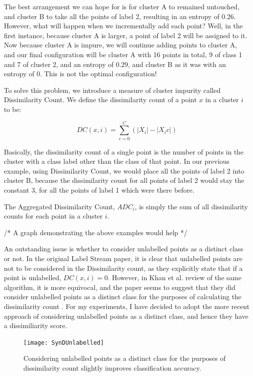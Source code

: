 \documentclass[12pt,a4paper,oneside]{report}
\begin{document}
The best arrangement we can hope for is for cluster A to remained untouched, and cluster B to take all the points of label 2, resulting in an entropy of 0.26. However, what will happen when we incrementally add each point? Well, in the first instance, because cluster A is larger, a point of label 2 will be assigned to it. Now because cluster A is impure, we will continue adding points to cluster A, and our final configuration will be cluster A with 16 points in total, 9 of class 1 and  7 of cluster 2, and an entropy of 0.29, and cluster B as it was with an entropy of 0. This is not the optimal configuration!

To solve this problem, we introduce a measure of cluster impurity called Dissimilarity Count. We define the dissimilarity count of a point \(x\) in a cluster \(i\) to be:

\[DC(x,i) = \sum_{c=0}^C(|X_i| - |X_ic|)\] 

Basically, the dissimilarity count of a single point is the number of points in the cluster with a class label other than the class of that point. In our previous example, using Dissimilarity Count, we would place all the points of label 2 into cluster B, because the dissimilarity count for all points of label 2 would stay the constant 3, for all the points of label 1 which were there before. 

The Aggregated Dissimilarity Count, $ADC_i$, is simply the sum of all dissimilarity counts for each point in a cluster $i$. 

/* A graph demonstrating the above examples would help */

An outstanding issue is whether to consider unlabelled points as a distinct class or not. In the original Label Stream paper, it is clear that unlabelled points are not to be considered in the Dissimilarity count, as they explicitly state that if a point is unlabelled, \(DC(x,i) = 0\).\cite{LabStr} However, in Khan et al. review of the same algorithm, it is more equivocal, and the paper seems to suggest that they did consider unlabelled points as a distinct class for the purposes of calculating the dissimilarity count \cite{TechRep}. For my experiments, I have decided to adopt the more recent approach of considering unlabelled points as a distinct class, and hence they have a dissimiliarity score. 

\begin{figure}
	\centering
	\texttt{[image: SynDUnlabelled]}
	\caption{Considering unlabelled points as a distinct class for the purposes of dissimilarity count slightly improves classification accuracy.}
\end{figure}
 
\end{document}
